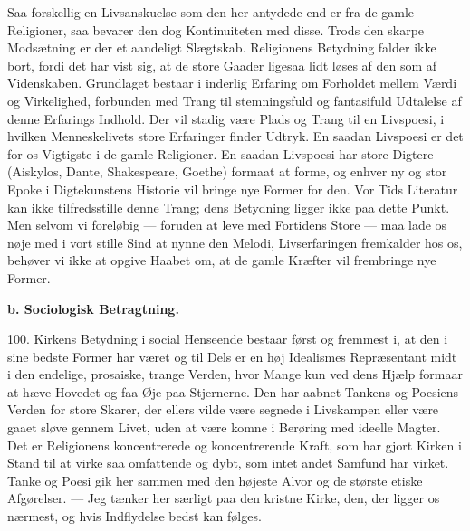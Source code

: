 \documentclass[12pt,a4paper,openany]{book}
\newcommand{\opage}[1]{\marginnote{\footnotesize\textit{[#1]}}}
\begin{document}
Saa forskellig en Livsanskuelse som den her antydede end er fra de gamle
Religioner, saa bevarer den dog Kontinuiteten med disse. Trods den
skarpe Modsætning er der et aandeligt Slægtskab. Religionens Betydning
falder ikke bort, fordi det har vist sig, at de store Gaader ligesaa
lidt løses af den som af Videnskaben. Grundlaget bestaar i inderlig
Erfaring om Forholdet mellem Værdi og Virkelighed, forbunden med Trang
til stemningsfuld og fantasifuld Udtalelse af denne Erfarings Indhold.
Der vil stadig være Plads og Trang til en Livspoesi, i hvilken
Menneskelivets store Erfaringer finder Udtryk. En saadan Livspoesi er
det for os Vigtigste i de gamle Religioner. En saadan Livspoesi har
store Digtere (Aiskylos, Dante, Shakespeare, Goethe) formaat at forme,
og enhver ny og stor Epoke i Digtekunstens Historie vil bringe nye
Former for den. Vor Tids Literatur kan ikke tilfredsstille denne Trang;
dens Betydning ligger ikke paa dette Punkt. Men selvom vi foreløbig ---
foruden at leve med Fortidens Store --- maa lade os nøje med i vort
stille Sind at nynne den Melodi, Livserfaringen fremkalder hos os,
behøver vi ikke at opgive Haabet om, at de gamle Kræfter vil frembringe
nye Former.

\begin{center}\textbf{b. Sociologisk Betragtning.}\end{center}

100. Kirkens Betydning i social Henseende bestaar først og fremmest i,
at den i sine bedste Former har været og til Dels er en høj Idealismes
Repræsentant midt i den endelige, prosaiske,
\opage{226}trange Verden, hvor Mange kun ved dens Hjælp formaar at hæve
Hovedet og faa Øje paa Stjernerne. Den har aabnet Tankens og Poesiens
Verden for store Skarer, der ellers vilde være segnede i Livskampen
eller være gaaet sløve gennem Livet, uden at være komne i Berøring med
ideelle Magter. Det er Religionens koncentrerede og koncentrerende
Kraft, som har gjort Kirken i Stand til at virke saa omfattende og dybt,
som intet andet Samfund har virket. Tanke og Poesi gik her sammen med
den højeste Alvor og de største etiske Afgørelser. --- Jeg tænker her
særligt paa den kristne Kirke, den, der ligger os nærmest, og hvis
Indflydelse bedst kan følges.
\end{document}

